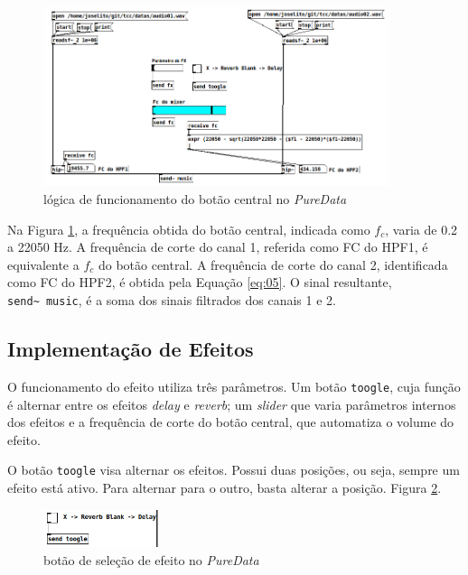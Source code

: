     \begin{figure}[h]
        \centering
        \includegraphics[width=0.9\textwidth]{figuras/fig44.png}
        \caption{lógica de funcionamento do botão central no \textit{PureData}}
        \label{fig44}
    \end{figure}

    Na Figura \ref{fig44}, a frequência obtida do botão central, indicada como \( f_c \), varia de 0.2 a 22050 Hz. A frequência de corte do canal 1, referida como FC do HPF1, é equivalente a \( f_c \) do botão central. A frequência de corte do canal 2, identificada como FC do HPF2, é obtida pela Equação \ref{eq:05}. O sinal resultante, \texttt{send\textasciitilde\ music}, é a soma dos sinais filtrados dos canais 1 e 2.

	\subsection{Implementação de Efeitos}

    O funcionamento do efeito utiliza três parâmetros. Um botão \texttt{toogle}, cuja função é alternar entre os efeitos \textit{delay} e \textit{reverb}; um \textit{slider} que varia parâmetros internos dos efeitos e a frequência de corte do botão central, que automatiza o volume do efeito.

    O botão \texttt{toogle} visa alternar os efeitos. Possui duas posições, ou seja, sempre um efeito está ativo. Para alternar para o outro, basta alterar a posição. Figura \ref{fig46}.

    \begin{figure}[h]
        \centering
        \includegraphics[width=0.3\textwidth]{figuras/fig46.png}
        \caption{botão de seleção de efeito no \textit{PureData}}
        \label{fig46}
    \end{figure}

